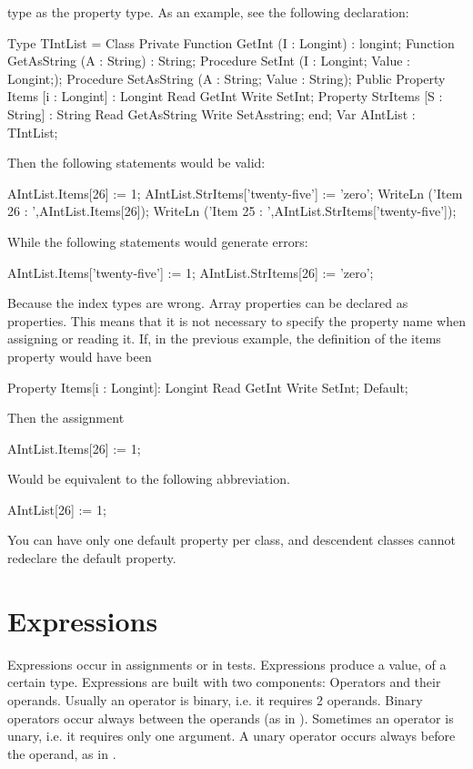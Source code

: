 \documentclass{report}
\begin{document}
type as the property type.
As an example, see the following declaration:
\begin{listing}
Type TIntList = Class
      Private
      Function GetInt (I : Longint) : longint;
      Function GetAsString (A : String) : String;
      Procedure SetInt (I : Longint; Value : Longint;);
      Procedure SetAsString (A : String; Value : String);
      Public
      Property Items [i : Longint] : Longint Read GetInt 
                                             Write SetInt;
      Property StrItems [S : String] : String Read GetAsString 
                                              Write SetAsstring;
      end;
Var AIntList : TIntList;
\end{listing}
Then the following statements would be valid:
\begin{listing}
AIntList.Items[26] := 1;
AIntList.StrItems['twenty-five'] := 'zero';
WriteLn ('Item 26 : ',AIntList.Items[26]);
WriteLn ('Item 25 : ',AIntList.StrItems['twenty-five']);
\end{listing}
While the following statements would generate errors:
\begin{listing}
AIntList.Items['twenty-five'] := 1;
AIntList.StrItems[26] := 'zero';
\end{listing}
Because the index types are wrong.
Array properties can be declared as  properties. This means that
it is not necessary to specify the property name when assigning or reading
it. If, in the previous example, the definition of the items property would 
have been
\begin{listing}
 Property Items[i : Longint]: Longint Read GetInt 
                                      Write SetInt; Default;
\end{listing}
Then the assignment
\begin{listing}
AIntList.Items[26] := 1;
\end{listing}
Would be equivalent to the following abbreviation.
\begin{listing}
AIntList[26] := 1;
\end{listing}
You can have only one default property per class, and descendent classes
cannot redeclare the default property.
\chapter{Expressions}
\label{ch:Expressions}
Expressions occur in assignments or in tests. Expressions produce a value,
of a certain type. 
Expressions are built with two components: Operators and their operands.
Usually an operator is binary, i.e. it requires 2 operands. Binary operators
occur always between the operands (as in ). Sometimes an
operator is unary, i.e. it requires only one argument. A unary operator
occurs always before the operand, as in .
 
\end{document}
